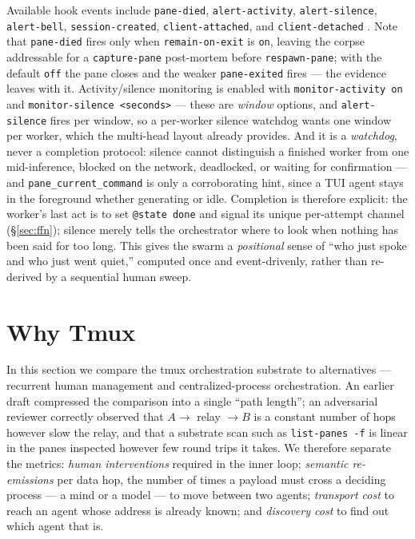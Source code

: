 \documentclass[10pt]{article}
\newcommand{\code}[1]{\texttt{\small #1}}
\begin{document}
Available hook events include \code{pane-died}, \code{alert-activity},
\code{alert-silence}, \code{alert-bell}, \code{session-created},
\code{client-attached}, and \code{client-detached} \cite{tmuxhooks}. Note that
\code{pane-died} fires only when \code{remain-on-exit} is \code{on}, leaving the
corpse addressable for a \code{capture-pane} post-mortem before \code{respawn-pane};
with the default \code{off} the pane closes and the weaker \code{pane-exited} fires
--- the evidence leaves with it. Activity/silence monitoring is enabled with
\code{monitor-activity on} and \code{monitor-silence <seconds>} --- these are
\emph{window} options, and \code{alert-silence} fires per window, so a per-worker
silence watchdog wants one window per worker, which the multi-head layout already
provides. And it is a \emph{watchdog}, never a completion protocol: silence cannot
distinguish a finished worker from one mid-inference, blocked on the network,
deadlocked, or waiting for confirmation --- and \code{pane\_current\_command} is
only a corroborating hint, since a TUI agent stays in the foreground whether
generating or idle. Completion is therefore explicit: the worker's last act is to
set \code{@state done} and signal its unique per-attempt channel
(\S\ref{sec:ffn}); silence merely tells the orchestrator where to look when nothing
has been said for too long. This gives the swarm a \emph{positional} sense of ``who
just spoke and who just went quiet,'' computed once and event-drivenly, rather than
re-derived by a sequential human sweep.

\section{Why Tmux}\label{sec:why}

In this section we compare the tmux orchestration substrate to alternatives ---
recurrent human management and centralized-process orchestration. An earlier draft
compressed the comparison into a single ``path length''; an adversarial reviewer
correctly observed that $A \to$ relay $\to B$ is a constant number of hops however
slow the relay, and that a substrate scan such as \code{list-panes -f} is linear in
the panes inspected however few round trips it takes. We therefore separate the
metrics: \emph{human interventions} required in the inner loop; \emph{semantic
re-emissions} per data hop, the number of times a payload must cross a deciding
process --- a mind or a model --- to move between two agents; \emph{transport cost}
to reach an agent whose address is already known; and \emph{discovery cost} to find
out which agent that is.
\end{document}
